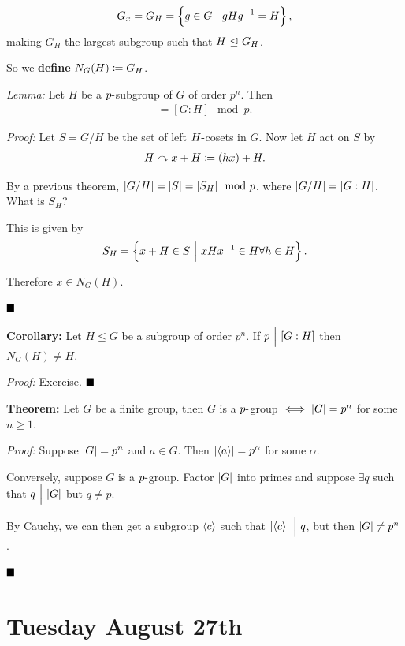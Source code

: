 \begin{align*}
G_x = G_H = \left\{{g\in G \mathrel{\Big|} gHg^{-1} = H}\right\}
,\end{align*} making \(G_H\) the largest subgroup such that
\(H {~\trianglelefteq~} G_H\).

So we \textbf{define} \(N_G(H) \coloneqq G_H\).

\emph{Lemma:} Let \(H\) be a \(p{\hbox{-}}\)subgroup of \(G\) of order
\(p^n\). Then
\begin{align*}
[N_G(H) : H] = [G : H] \mod p
.\end{align*}

\emph{Proof:} Let \(S = G/H\) be the set of left \(H{\hbox{-}}\)cosets in
\(G\). Now let \(H\) act on \(S\) by
\begin{align*}
H\curvearrowright x + H \coloneqq (hx) + H
.\end{align*}

By a previous theorem, \({\left\lvert {G/H} \right\rvert} = {\left\lvert {S} \right\rvert} = {\left\lvert {S_H} \right\rvert} \mod p\), where
\({\left\lvert {G/H} \right\rvert} = [G: H]\). What is \(S_H\)?

This is given by
\begin{align*}
S_H = \left\{{x + H \in S {~\mathrel{\Big|}~} xHx^{-1} \in H \forall h\in H}\right\}
.\end{align*}

Therefore \(x\in N_G(H)\).

\(\qed\)

\textbf{Corollary:} Let \(H \leq G\) be a subgroup of order \(p^n\). If
\(p {~\Bigm| ~} [G: H]\) then \(N_G(H) \neq H\).

\emph{Proof:} Exercise. \(\qed\)

\textbf{Theorem:} Let \(G\) be a finite group, then \(G\) is a
\(p{\hbox{-}}\)group \(\iff {\left\lvert {G} \right\rvert} = p^n\) for some \(n\geq 1\).

\emph{Proof:} Suppose \({\left\lvert {G} \right\rvert} = p^n\) and \(a \in G\). Then
\({\left\lvert {\left\langle{a}\right\rangle} \right\rvert} = p^\alpha\) for some \(\alpha\).

Conversely, suppose \(G\) is a \(p{\hbox{-}}\)group. Factor \({\left\lvert {G} \right\rvert}\) into
primes and suppose \(\exists q\) such that \(q {~\Bigm| ~} {\left\lvert {G} \right\rvert}\) but
\(q \neq p\).

By Cauchy, we can then get a subgroup \(\left\langle{c}\right\rangle\) such that
\({\left\lvert {\left\langle{c}\right\rangle} \right\rvert} {~\Bigm| ~} q\), but then \({\left\lvert {G} \right\rvert} \neq p^n\).

\(\qed\)

\hypertarget{tuesday-august-27th}{%
\section{Tuesday August 27th}\label{tuesday-august-27th}}

